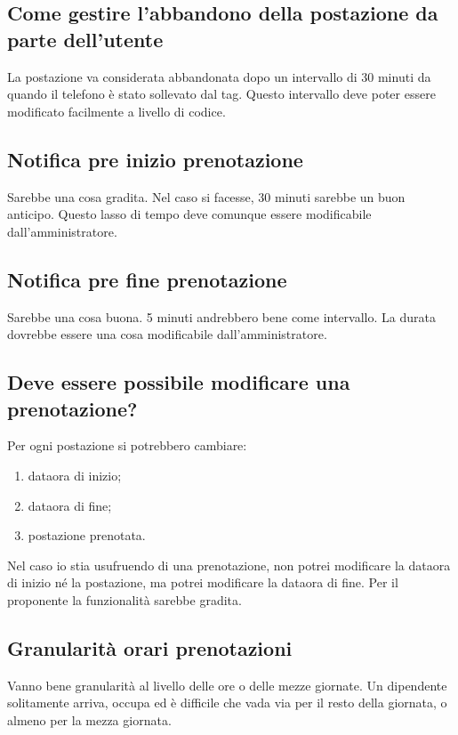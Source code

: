 \subsection*{Come gestire l'abbandono della postazione da parte dell'utente}
La postazione va considerata abbandonata dopo un intervallo di 30 minuti da quando il telefono è stato sollevato dal tag. Questo intervallo deve poter essere modificato facilmente a livello di codice.

\subsection*{Notifica pre inizio prenotazione}
Sarebbe una cosa gradita. Nel caso si facesse, 30 minuti sarebbe un buon anticipo. \newline
Questo lasso di tempo deve comunque essere modificabile dall'amministratore.

\subsection*{Notifica pre fine prenotazione}
Sarebbe una cosa buona. 5 minuti andrebbero bene come intervallo. La durata dovrebbe essere una cosa modificabile dall'amministratore.

\subsection*{Deve essere possibile modificare una prenotazione? }
Per ogni postazione si potrebbero cambiare:
\begin{enumerate}
	\item dataora di inizio;
	\item dataora di fine;
	\item postazione prenotata.
\end{enumerate}	
Nel caso io stia usufruendo di una prenotazione, non potrei modificare la dataora di inizio né la postazione, ma potrei modificare la dataora di fine.\newline
Per il proponente la funzionalità sarebbe gradita.

\subsection*{Granularità orari prenotazioni}
Vanno bene granularità al livello delle ore o delle mezze giornate.
Un dipendente solitamente arriva, occupa ed è difficile che vada via per il resto della giornata, o almeno per la mezza giornata.

